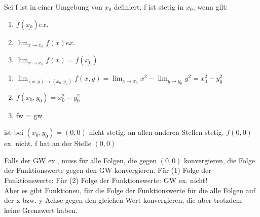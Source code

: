 \documentclass{../tudscript}
\begin{document}
    Sei
    f ist in einer Umgebung von $x_0$ definiert, f ist stetig in $x_0$, wenn gilt:
    \begin{enumerate}
        \item $f(\underline{x_0}) ex.$
        \item $\lim_{x \to x_0} f(x) ex.$
        \item $\lim_{x \to x_0} f(x) = f(\underline{x_0})$
    \end{enumerate}
    
    \begin{enumerate}
    \item $\lim_{(x, y) \to (x_0, y_0)} f(x, y) = \lim_{x \to x_0} x^2 - \lim_{y \to y_0} y^2 = x_{0}^2 - y_{0}^2 $
    \item $f(x_0, y_0) = x_{0}^2 - y_{0}^2$
    \item fw = gw
    \end{enumerate}
    ist bei $(x_0, y_0) = (0,0)$ nicht stetig, an allen anderen Stellen stetig.
    $f(0,0)$ ex. nicht. f hat an der Stelle $(0,0)$
    
    Falls der GW ex., muss für alle Folgen, die gegen $(0,0)$ konvergieren, die 
    Folge der Funktionswerte gegen den GW konvergieren.
Für (1) Folge der Funktionswerte:
Für (2) Folge der Funktionswerte:
    GW ex. nicht!\\
    Aber es gibt Funktionen, für die Folge der Funktionswerte für die alle \newline
 Folgen auf der x bzw. y Achse gegen den gleichen Wert konvergieren, \newline die aber trotzdem keine Grenzwert haben.
        
\end{document}
